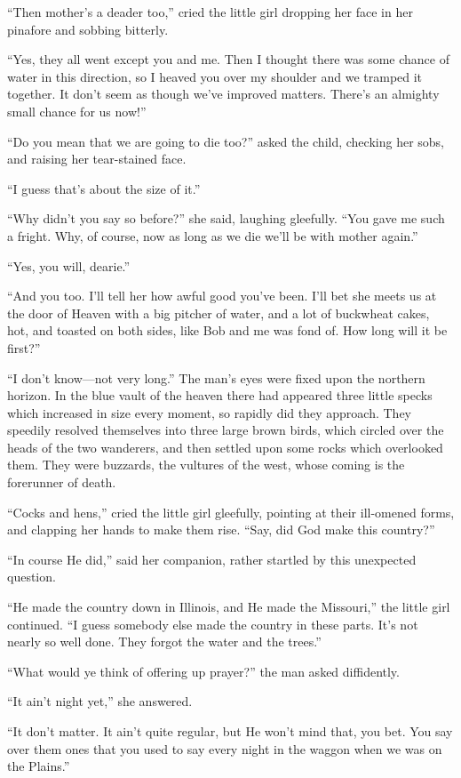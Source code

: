 \documentclass[12pt]{book}
\begin{document}
“Then mother’s a deader too,” cried the little girl dropping her face in her pinafore and sobbing bitterly. 

“Yes, they all went except you and me. Then I thought there was some chance of water in this direction, so I heaved you over my shoulder and we tramped it together. It don’t seem as though we’ve improved matters. There’s an almighty small chance for us now!” 

“Do you mean that we are going to die too?” asked the child, checking her sobs, and raising her tear-stained face. 

“I guess that’s about the size of it.” 

“Why didn’t you say so before?” she said, laughing gleefully. “You gave me such a fright. Why, of course, now as long as we die we’ll be with mother again.” 

“Yes, you will, dearie.” 

“And you too. I’ll tell her how awful good you’ve been. I’ll bet she meets us at the door of Heaven with a big pitcher of water, and a lot of buckwheat cakes, hot, and toasted on both sides, like Bob and me was fond of. How long will it be first?” 

“I don’t know—not very long.” The man’s eyes were fixed upon the northern horizon. In the blue vault of the heaven there had appeared three little specks which increased in size every moment, so rapidly did they approach. They speedily resolved themselves into three large brown birds, which circled over the heads of the two wanderers, and then settled upon some rocks which overlooked them. They were buzzards, the vultures of the west, whose coming is the forerunner of death. 

“Cocks and hens,” cried the little girl gleefully, pointing at their ill-omened forms, and clapping her hands to make them rise. “Say, did God make this country?” 

“In course He did,” said her companion, rather startled by this unexpected question. 

“He made the country down in Illinois, and He made the Missouri,” the little girl continued. “I guess somebody else made the country in these parts. It’s not nearly so well done. They forgot the water and the trees.” 

“What would ye think of offering up prayer?” the man asked diffidently. 

“It ain’t night yet,” she answered. 

“It don’t matter. It ain’t quite regular, but He won’t mind that, you bet. You say over them ones that you used to say every night in the waggon when we was on the Plains.” 
\end{document}

